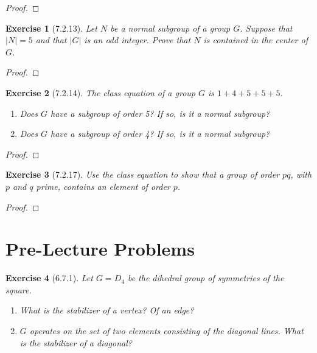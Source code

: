 \documentclass[12pt]{article}
\newtheorem*{exer}{Exercise}
\begin{document}
\begin{proof}

\end{proof}


\begin{exer}[7.2.13]
    Let $N$ be a normal subgroup of a group $G$. Suppose that $|N| = 5$
    and that $|G|$ is an odd integer. Prove that $N$ is contained in the
    center of $G$.
\end{exer}

\begin{proof}

\end{proof}


\begin{exer}[7.2.14]
    The class equation of a group $G$ is $ 1 + 4 + 5 + 5 + 5$.
    \begin{enumerate}
        \item Does $G$ have a subgroup of order 5? If so, is it a normal
            subgroup?
        \item Does $G$ have a subgroup of order 4? If so, is it a normal
            subgroup?
    \end{enumerate}
\end{exer}

\begin{proof}

\end{proof}


\begin{exer}[7.2.17]
    Use the class equation to show that a group of order $pq$, with $p$
    and $q$ prime, contains an element of order $p$.
\end{exer}

\begin{proof}

\end{proof}

\section*{Pre-Lecture Problems}

\begin{exer}[6.7.1]
    Let $G = D_4$ be the dihedral group of symmetries of the square.
    \begin{enumerate}
        \item What is the stabilizer of a vertex? Of an edge?
        \item $G$ operates on the set of two elements consisting of the
            diagonal lines. What is the stabilizer of a diagonal?
    \end{enumerate}
\end{exer}
\end{document}
